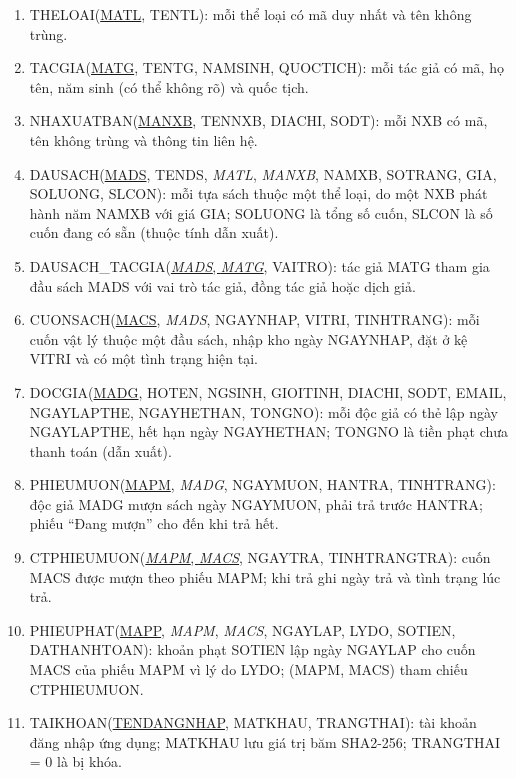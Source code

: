 \documentclass[a4paper,oneside]{report}
\begin{document}
\begin{enumerate}[leftmargin=1.8em]
\item THELOAI(\underline{MATL}, TENTL): mỗi thể loại có mã duy nhất và tên không trùng.
\item TACGIA(\underline{MATG}, TENTG, NAMSINH, QUOCTICH): mỗi tác giả có mã, họ tên, năm sinh (có thể không rõ) và quốc tịch.
\item NHAXUATBAN(\underline{MANXB}, TENNXB, DIACHI, SODT): mỗi NXB có mã, tên không trùng và thông tin liên hệ.
\item DAUSACH(\underline{MADS}, TENDS, \textit{MATL}, \textit{MANXB}, NAMXB, SOTRANG, GIA, SOLUONG, SLCON): mỗi tựa sách thuộc một thể loại, do một NXB phát hành năm NAMXB với giá GIA; SOLUONG là tổng số cuốn, SLCON là số cuốn đang có sẵn (thuộc tính dẫn xuất).
\item DAUSACH\_TACGIA(\underline{\textit{MADS}, \textit{MATG}}, VAITRO): tác giả MATG tham gia đầu sách MADS với vai trò tác giả, đồng tác giả hoặc dịch giả.
\item CUONSACH(\underline{MACS}, \textit{MADS}, NGAYNHAP, VITRI, TINHTRANG): mỗi cuốn vật lý thuộc một đầu sách, nhập kho ngày NGAYNHAP, đặt ở kệ VITRI và có một tình trạng hiện tại.
\item DOCGIA(\underline{MADG}, HOTEN, NGSINH, GIOITINH, DIACHI, SODT, EMAIL, NGAYLAPTHE, NGAYHETHAN, TONGNO): mỗi độc giả có thẻ lập ngày NGAYLAPTHE, hết hạn ngày NGAYHETHAN; TONGNO là tiền phạt chưa thanh toán (dẫn xuất).
\item PHIEUMUON(\underline{MAPM}, \textit{MADG}, NGAYMUON, HANTRA, TINHTRANG): độc giả MADG mượn sách ngày NGAYMUON, phải trả trước HANTRA; phiếu “Đang mượn” cho đến khi trả hết.
\item CTPHIEUMUON(\underline{\textit{MAPM}, \textit{MACS}}, NGAYTRA, TINHTRANGTRA): cuốn MACS được mượn theo phiếu MAPM; khi trả ghi ngày trả và tình trạng lúc trả.
\item PHIEUPHAT(\underline{MAPP}, \textit{MAPM}, \textit{MACS}, NGAYLAP, LYDO, SOTIEN, DATHANHTOAN): khoản phạt SOTIEN lập ngày NGAYLAP cho cuốn MACS của phiếu MAPM vì lý do LYDO; (MAPM, MACS) tham chiếu CTPHIEUMUON.
\item TAIKHOAN(\underline{TENDANGNHAP}, MATKHAU, TRANGTHAI): tài khoản đăng nhập ứng dụng; MATKHAU lưu giá trị băm SHA2-256; TRANGTHAI = 0 là bị khóa.
\end{enumerate}

\end{document}
